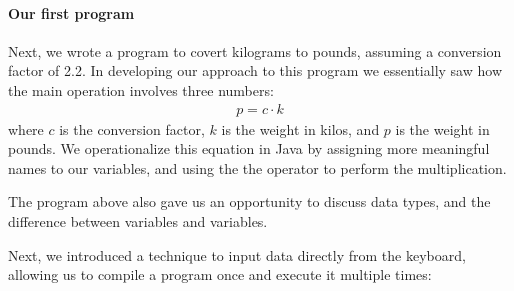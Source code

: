 \documentclass[letterpaper,10pt,english]{sphinxmanual}
\begin{document}
\paragraph{Our first  program}
\label{\detokenize{COMP170/2020Spring/week2:our-first-real-program}}
Next, we wrote a program to covert kilograms to pounds, assuming a conversion factor of 2.2. In developing our approach to this program we essentially saw how the main operation involves three numbers:
\begin{equation*}
\begin{split}p=c\cdot k\end{split}
\end{equation*}
where \(c\) is the conversion factor, \(k\) is the weight in kilos, and \(p\) is the weight in pounds. We operationalize this equation in Java by assigning more meaningful names to our variables, and using the the operator \sphinxcode{\sphinxupquote{*}} to perform the multiplication.

\begin{sphinxVerbatim}[commandchars=\\\{\},numbers=left,firstnumber=1,stepnumber=1]
   
     \PYG{o}{[}\PYG{o}{]}  
        
           
         
          
              
\end{sphinxVerbatim}

The program above also gave us an opportunity to discuss data types, and the difference between  variables and  variables.

Next, we introduced a technique to input data directly from the keyboard, allowing us to compile a program once and execute it multiple times:
\end{document}
